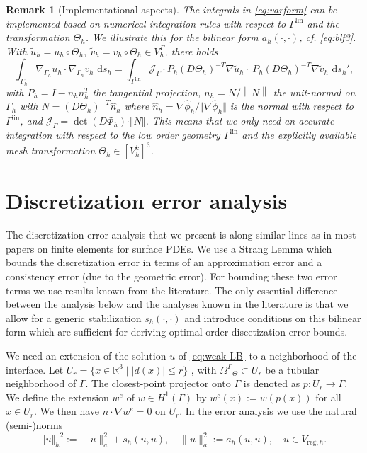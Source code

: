 \documentclass[final]{siamltex}
\newtheorem{remark}{Remark}
\begin{document}
\begin{remark}[Implementational aspects]\rm
The integrals in \eqref{eq:varform} can be implemented based on numerical integration rules with respect to ${\Gamma^{\text{lin}}}$ and the transformation $\Theta_h$. We illustrate this for the bilinear form $a_h(\cdot,\cdot)$, cf. \eqref{eq:blf3}. With $\tilde{u}_h = u_h \circ \Theta_h,~\tilde{v}_h = v_h \circ \Theta_h \in V_h^\Gamma$, there holds
\begin{equation*}
\int_{\Gamma_h} \nabla_{\Gamma_h} u_h \cdot \nabla_{\Gamma_h} v_h \, {\,\mathrm{d} {s_h}} = 
\int_{\Gamma^{\text{lin}}} \mathcal{J}_\Gamma \cdot P_h (D \Theta_h)^{-T} \nabla \tilde{u}_h \cdot 
\ P_h (D \Theta_h)^{-T} \nabla \tilde{v}_h \, {\,\mathrm{d} {s_h'}},
\end{equation*}
with $P_h = I - n_h n_h^T$ the tangential projection, $n_h = N / {\left\lVert {N} \right\rVert}$ the unit-normal on $\Gamma_h$ with $N = (D \Theta_h)^{-T} \hat{n}_h$ where $\hat{n}_h = \nabla {\hat \phi_h} / \Vert\nabla {\hat \phi_h}\Vert$ is the normal with respect to ${\Gamma^{\text{lin}}}$, and $\mathcal{J}_\Gamma = \det(D \Phi_h) \cdot \Vert N \Vert$.
This means that we only need an accurate integration with respect to the low order geometry ${\Gamma^{\text{lin}}}$ and the explicitly available mesh transformation $\Theta_h \in [V_h^k]^3$.
\end{remark}

\section{Discretization error analysis}
\label{sec:error-analysis}
The discretization error analysis that we present is along similar lines as in most papers on finite elements for surface PDEs. We use a Strang Lemma which bounds the discretization error in terms of an approximation error and a consistency error (due to the geometric error). For bounding these two error terms we use results known from the literature. The only essential difference between the analysis below and the analyses known in the literature is that we allow for a generic stabilization $s_h(\cdot,\cdot)$ and introduce conditions on this bilinear form which are sufficient for deriving optimal order discetization error bounds.

We need an extension of the solution $u$ of \eqref{eq:weak-LB} to a neighborhood of the interface.
Let $ U_r=\{x\in{\mathbb{R}}^3\mid \lvert d(x) \rvert \le r\}$ , with ${\Omega^{\Gamma}}_{\Theta} \subset U_r$ be a tubular neighborhood of $\Gamma$. The closest-point projector onto $\Gamma$ is denoted as $p\colon U_r\to \Gamma$. We define the extension $w^e$ of $w \in H^1(\Gamma)$ by $w^e(x):=w(p(x))$ for all $x \in U_r$. We then have $n\cdot \nabla w^e =0$ on $U_r$. In the error analysis we use the natural (semi-)norms
\begin{equation}\label{eq:def-h-norm}
  {\Vert {u} \Vert_h}^2 :=\|u\|_a^2 + s_h(u,u), \quad \|u\|_a^2:=a_h(u,u), \quad u \in {V_{\text{reg},h}}.
\end{equation}
\end{document}
